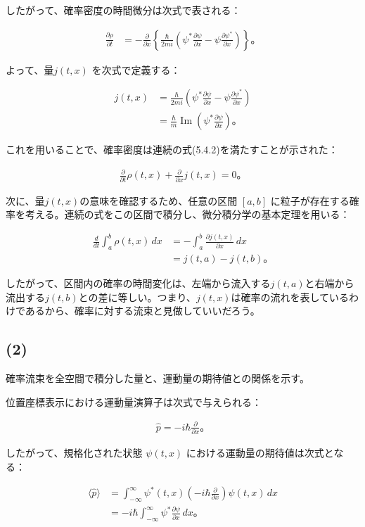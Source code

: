 \documentclass[platex,dvipdfmx,a4paper]{jsarticle}
\newcommand{\hb}[2]{\frac{\partial #1}{\partial #2}}
\newcommand{\bbn}[2]{\frac{d #1}{d #2}}
\begin{document}
したがって、確率密度の時間微分は次式で表される：

\begin{align*}
  \hb{\rho}{t}
  &=-\hb{}{x}
  \left\{
    \frac{\hbar}{2mi}
    \left(
      \psi^*\hb{\psi}{x}
      -\psi\hb{\psi^*}{x}
    \right)
  \right\}。
\end{align*}

よって、量$j(t,x)$ を次式で定義する：

\begin{align*}
  j(t,x)
  &=\frac{\hbar}{2mi}
  \left(
    \psi^*\hb{\psi}{x}
    -\psi\hb{\psi^*}{x}
  \right) \\
  &=\frac{\hbar}{m}
  \operatorname{Im}
  \left(
    \psi^*\hb{\psi}{x}
  \right)。
\end{align*}

これを用いることで、確率密度は連続の式(5.4.2)を満たすことが示された：

\begin{align*}
  \hb{}{t}\rho(t,x)+\hb{}{x}j(t,x)=0。
\end{align*}

次に、量$j(t,x)$の意味を確認するため、任意の区間 $[a,b]$ に粒子が存在する確率を考える。連続の式をこの区間で積分し、微分積分学の基本定理を用いる：

\begin{align*}
  \bbn{}{t}\int_a^b\rho(t,x)\,dx
  &=-\int_a^b\hb{j(t,x)}{x}\,dx \\
  &=j(t,a)-j(t,b)。
\end{align*}

したがって、区間内の確率の時間変化は、左端から流入する$j(t,a)$と右端から流出する$j(t,b)$との差に等しい。つまり、$j(t,x)$は確率の流れを表しているわけであるから、確率に対する流束と見做していいだろう。

\subsection*{(2)}

確率流束を全空間で積分した量と、運動量の期待値との関係を示す。

位置座標表示における運動量演算子は次式で与えられる：

\begin{align*}
  \hat{p}=-i\hbar\hb{}{x}。
\end{align*}

したがって、規格化された状態 $\psi(t,x)$ における運動量の期待値は次式となる：

\begin{align*}
  \langle\hat{p}\rangle
  &=\int_{-\infty}^{\infty}
  \psi^*(t,x)
  \left(
    -i\hbar\hb{}{x}
  \right)
  \psi(t,x)\,dx \\
  &=-i\hbar
  \int_{-\infty}^{\infty}
  \psi^*\hb{\psi}{x}\,dx。
\end{align*}
\end{document}
